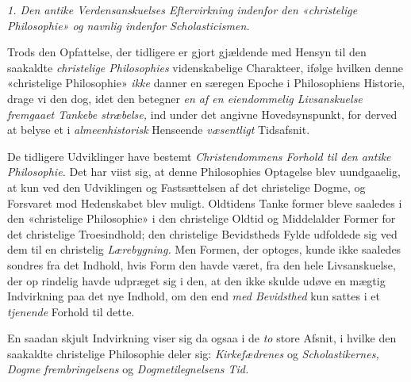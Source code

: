 \emph{1. Den antike Verdensanskuelses Eftervirkning
indenfor den «christelige Philosophie» og navnlig
indenfor Scholasticismen.}

Trods den Opfattelse, der tidligere er gjort gjældende
med Hensyn til den saakaldte \emph{christelige Philosophies}
videnskabelige Charakteer, ifølge hvilken denne «christelige
Philosophie» \emph{ikke} danner en særegen Epoche i Philosophiens
Historie, drage vi den dog, idet den betegner \emph{en af en
eiendommelig Livsanskuelse fremgaaet Tankebe\-%
stræbelse,} ind under det angivne Hovedsynspunkt, for derved
at belyse et i \emph{almeenhistorisk} Henseende \emph{væsentligt}
Tidsafsnit.

De tidligere Udviklinger have bestemt \emph{Christendommens
Forhold til den antike Philosophie.} Det har viist sig,
at denne Philosophies Optagelse blev uundgaaelig, at kun ved
den Udviklingen og Fastsættelsen af det christelige Dogme, og
Forsvaret mod Hedenskabet blev muligt. Oldtidens Tanke\-%
\setcounter{footnote}{0}%
former bleve saaledes i den «christelige Philosophie» i den
christelige Oldtid og Middelalder Former for det christelige
Troesindhold; den christelige Bevidstheds Fylde udfoldede sig
ved dem til en christelig \emph{Lærebygning.} Men Formen, der
optoges, kunde ikke saaledes sondres fra det Indhold, hvis
Form den havde været, fra den hele Livsanskuelse, der op\-%
rindelig havde udpræget sig i den, at den ikke skulde udøve
en mægtig Indvirkning paa det nye Indhold, om den end
\emph{med Bevidsthed} kun sattes i et \emph{tjenende} Forhold til
dette.

En saadan skjult Indvirkning viser sig da ogsaa i de \emph{to}
store Afsnit, i hvilke den saakaldte christelige Philosophie
deler sig: \emph{Kirkefædrenes} og \emph{Scholastikernes, Dogme\-%
frembringelsens} og \emph{Dogmetilegnelsens Tid.}

